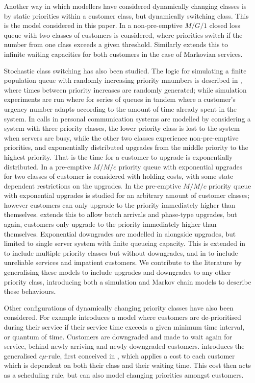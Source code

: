 \documentclass{article}
\begin{document}
Another way in which modellers have considered dynamically changing classes is
by static priorities within a customer class, but dynamically switching class.
This is the model considered in this paper. In  \cite{fratini90} a
non-pre-emptive $M/G/1$ closed loss queue with two classes of customers is
considered, where priorities switch if the number from one class exceeds a given
threshold. Similarly \cite{knessl03} extends this to infinite waiting capacities
for both customers in the case of Markovian services.

Stochastic class switching has also been studied. The logic for simulating a
finite population queue with randomly increasing priority mnumbers is described
in \cite{panayiotopoulos80}, where times between priority increases are randomly
generated; while \cite{grindlay65} simulation experiments are run where for
series of queues in tandem where a customer's urgency number adapts according to
the amount of time already spent in the system. In \cite{xhafa01} calls in
personal communication systems are modelled by considering a system with three
priority classes, the lower priority class is lost to the system when servers
are busy, while the other two classes experience non-pre-emptive priorities, and
exponentially distributed upgrades from the middle priority to the highest
priority. That is the time for a customer to upgrade is exponentially
distributed. In \cite{down10} a pre-emptive $M/M/c$ priority queue with
exponential upgrades for two classes of customer is considered with holding
costs, with some state dependent restrictions on the upgrades. In \cite{xie08}
the pre-emptive $M/M/c$ priority queue with exponential upgrades is studied for
an arbitrary amount of customer classes; however customers can only upgrade to
the priority immediately higher than themselves. \cite{he12} extends this to
allow batch arrivals and phase-type upgrades, but again, customers only upgrade
to the priority immediately higher than themselves. Exponential downgrades are
modelled in \cite{klimenok20} alongside upgrades, but limited to single server
system with finite queueing capacity. This is extended in \cite{leeetal20} to
include multiple priority classes but without downgrades, and in \cite{dudin21}
to include unreliable services and impatient customers. We contribute to the
literature by generalising these models to include upgrades and downgrades to
any other priority class, introducing both a simulation and Markov chain models
to describe these behaviours.

Other configurations of dynamically changing priority classes have also been
considered. For example \cite{adiri71} introduces a model where customers are
de-prioritised during their service if their service time exceeds a given
minimum time interval, or quantum of time. Customers are downgraded and made to
wait again for service, behind newly arriving and newly downgraded customers.
\cite{vanmieghan95} introduces the generalised $c\mu$-rule, first conceived in
\cite{smith56}, which applies a cost to each customer which is dependent on both
their class and  their waiting time. This cost then acts as a scheduling rule,
but can also model changing priorities amongst customers.
\end{document}
